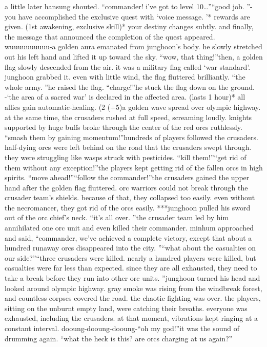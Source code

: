 a little later hansung shouted.
“commander! i’ve got to level 10…”“good job.
”-you have accomplished the exclusive quest  with ‘voice message.
’* rewards are given.
 (1st awakening, exclusive skill)* your destiny changes subtly.
and finally, the message that announced the completion of the quest appeared.
wuuuuuuuuuu-a golden aura emanated from junghoon’s body.
 he slowly stretched out his left hand and lifted it up toward the sky.
“wow, that thing!”then, a golden flag slowly descended from the air.
 it was a military flag called ‘war standard’.
 junghoon grabbed it.
 even with little wind, the flag fluttered brilliantly.
“the whole army.
”he raised the flag.
“charge!”he stuck the flag down on the ground.
-‘the area of a sacred war’ is declared in the affected area.
 (lasts 1 hour)* all allies gain automatic-healing.
 (2%
 (+5)a golden wave spread over olympic highway.
 at the same time, the crusaders rushed at full speed, screaming loudly.
 knights supported by huge buffs broke through the center of the red orcs ruthlessly.
“smash them by gaining momentum!”hundreds of players followed the crusaders.
 half-dying orcs were left behind on the road that the crusaders swept through.
 they were struggling like wasps struck with pesticides.
“kill them!”“get rid of them without any exception!”the players kept getting rid of the fallen orcs in high spirits.
“move ahead!”“follow the commander!”the crusaders gained the upper hand after the golden flag fluttered.
orc warriors could not break through the crusader team’s shields.
 because of that, they collapsed too easily.
even without the necromancer, they got rid of the orcs easily.
***junghoon pulled his sword out of the orc chief’s neck.
“it’s all over.
”the crusader team led by him annihilated one orc unit and even killed their commander.
minhum approached and said, “commander, we’ve achieved a complete victory, except that about a hundred runaway orcs disappeared into the city.
”“what about the casualties on our side?”“three crusaders were killed.
 nearly a hundred players were killed, but casualties were far less than expected.
 since they are all exhausted, they need to take a break before they run into other orc units.
”junghoon turned his head and looked around olympic highway.
 gray smoke was rising from the windbreak forest, and countless corpses covered the road.
 the chaotic fighting was over.
the players, sitting on the unburnt empty land, were catching their breaths.
everyone was exhausted, including the crusaders.
at that moment, vibrations kept ringing at a constant interval.
dooung-dooung-dooung-“oh my god!”it was the sound of drumming again.
“what the heck is this? are orcs charging at us again?”

